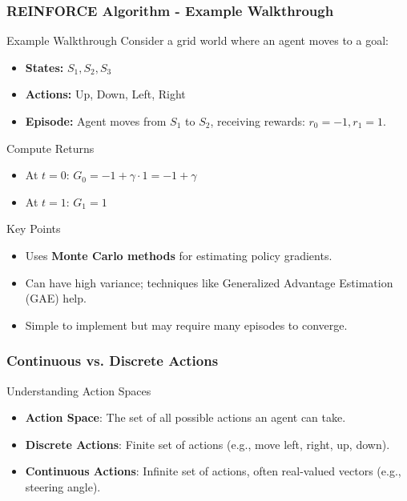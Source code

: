 \documentclass[aspectratio=169]{beamer}
\begin{document}
\begin{frame}[fragile]
    \frametitle{REINFORCE Algorithm - Example Walkthrough}
    \begin{block}{Example Walkthrough}
        Consider a grid world where an agent moves to a goal:
        \begin{itemize}
            \item \textbf{States:} $S_1, S_2, S_3$
            \item \textbf{Actions:} {Up, Down, Left, Right}
            \item \textbf{Episode:} Agent moves from $S_1$ to $S_2$, receiving rewards: $r_0 = -1, r_1 = 1$.
        \end{itemize}
    \end{block}

    \begin{block}{Compute Returns}
        \begin{itemize}
            \item At $t = 0$: $G_0 = -1 + \gamma \cdot 1 = -1 + \gamma$
            \item At $t = 1$: $G_1 = 1$
        \end{itemize}
    \end{block}
    \begin{block}{Key Points}
        \begin{itemize}
            \item Uses \textbf{Monte Carlo methods} for estimating policy gradients.
            \item Can have high variance; techniques like Generalized Advantage Estimation (GAE) help.
            \item Simple to implement but may require many episodes to converge.
        \end{itemize}
    \end{block}
\end{frame}

\begin{frame}[fragile]
    \frametitle{Continuous vs. Discrete Actions}
    \begin{block}{Understanding Action Spaces}
        \begin{itemize}
            \item \textbf{Action Space}: The set of all possible actions an agent can take.
            \item \textbf{Discrete Actions}: Finite set of actions (e.g., move left, right, up, down).
            \item \textbf{Continuous Actions}: Infinite set of actions, often real-valued vectors (e.g., steering angle).
        \end{itemize}
    \end{block}
\end{frame}
\end{document}
